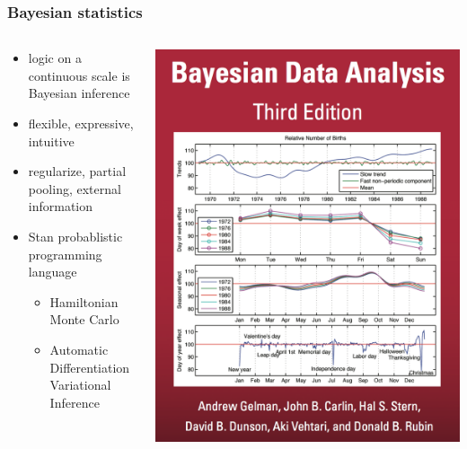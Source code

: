 \documentclass{beamer}
\begin{document}
\begin{frame}
  \frametitle{Bayesian statistics}

  \begin{columns}
    \begin{column}{0.5\textwidth}
      \begin{itemize}
        \item logic on a continuous scale is Bayesian inference
        \item flexible, expressive, intuitive
        \item regularize, partial pooling, external information
        \item Stan probablistic programming language
          \begin{itemize}
            \item Hamiltonian Monte Carlo
            \item Automatic Differentiation Variational Inference
          \end{itemize}
      \end{itemize}
    \end{column}
    \begin{column}{0.5\textwidth}
      \begin{center}
        \includegraphics[width = \textwidth,height = 0.8\textheight,keepaspectratio = true]{figure/bda_cover}
      \end{center}
    \end{column}
  \end{columns}
\end{frame}
\end{document}
